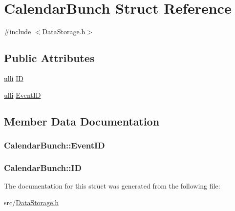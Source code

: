 \hypertarget{structCalendarBunch}{
\section{CalendarBunch Struct Reference}
\label{d5/df1/structCalendarBunch}
}


{\ttfamily \#include $<$DataStorage.h$>$}

\subsection*{Public Attributes}
\begin{DoxyCompactItemize}
\item 
\hyperlink{DataStorage_8h_afebafa022413aaef27ce1b01cbfa9791}{ulli} \hyperlink{structCalendarBunch_a44933e6c3a50ff7a39c505c6f0c75b36}{ID}
\item 
\hyperlink{DataStorage_8h_afebafa022413aaef27ce1b01cbfa9791}{ulli} \hyperlink{structCalendarBunch_a204d21d969decfb11e66acc991da54b7}{EventID}
\end{DoxyCompactItemize}


\subsection{Member Data Documentation}
\hypertarget{structCalendarBunch_a204d21d969decfb11e66acc991da54b7}{
\subsubsection[{EventID}]{ {\bf CalendarBunch::EventID}}}
\label{d5/df1/structCalendarBunch_a204d21d969decfb11e66acc991da54b7}
\hypertarget{structCalendarBunch_a44933e6c3a50ff7a39c505c6f0c75b36}{
\subsubsection[{ID}]{ {\bf CalendarBunch::ID}}}
\label{d5/df1/structCalendarBunch_a44933e6c3a50ff7a39c505c6f0c75b36}


The documentation for this struct was generated from the following file:\begin{DoxyCompactItemize}
\item 
src/\hyperlink{DataStorage_8h}{DataStorage.h}\end{DoxyCompactItemize}
